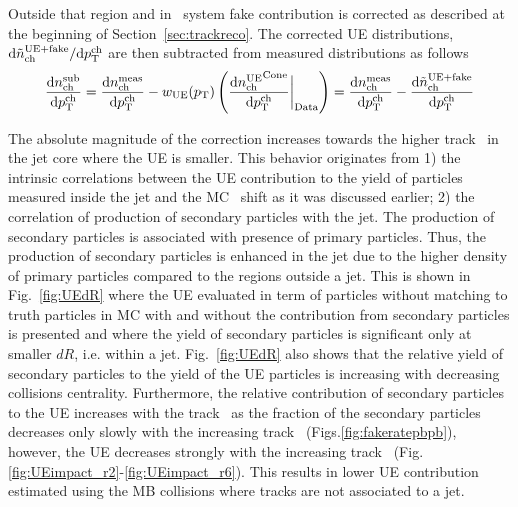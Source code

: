 Outside that region and in \pp\ system fake contribution is corrected as described at the beginning of Section~\ref{sec:trackreco}.
 The corrected UE distributions, $\mathrm{d} \mbox{$\tilde{n}_{\mathrm{ch}}^{\mathrm{UE+fake}}$} / \mathrm{d} \mbox{$p_{{\mathrm{T}}}^{\mathrm{ch}}$}$ are then subtracted from measured distributions as follows
 \begin{eqnarray}
\frac{\mathrm{d} n_{\mathrm{ch}}^{\mathrm{sub}}}{\mathrm{d} \mbox{$p_{{\mathrm{T}}}^{\mathrm{ch}}$}}  = \frac{\mathrm{d} n_{\mathrm{ch}}^{\mathrm{meas}}}{\mathrm{d} \mbox{$p_{{\mathrm{T}}}^{\mathrm{ch}}$}} - {w_{\mathrm{UE}} (\mbox{$p_{\mathrm{T}}$})} \left( \frac{\mathrm{d} \mbox{$n_{\mathrm{ch}}^{\mathrm{UE}}$}^{\mathrm{Cone}}}{\mathrm{d} \mbox{$p_{{\mathrm{T}}}^{\mathrm{ch}}$}} \bigg|_{\mathrm{Data}} \right)  = \frac{\mathrm{d} n_{\mathrm{ch}}^{\mathrm{meas}}}{\mathrm{d} \mbox{$p_{{\mathrm{T}}}^{\mathrm{ch}}$}} - \frac{\mathrm{d} \mbox{$\tilde{n}_{\mathrm{ch}}^{\mathrm{UE+fake}}$}}{\mathrm{d} \mbox{$p_{{\mathrm{T}}}^{\mathrm{ch}}$}}
 \end{eqnarray}


The absolute magnitude of the correction increases towards the higher track \pt\ in the jet core where the UE is smaller.
This behavior originates from 1) the intrinsic correlations between the UE contribution to the yield of particles measured inside the jet and the MC \pTjet\ shift as it was discussed earlier; 2) the correlation of production of secondary particles with the jet.
 The production of secondary particles is associated with presence of primary particles.
Thus, the production of secondary particles is enhanced in the jet due to the higher density of primary particles compared to the regions outside a jet.
This is shown in Fig.~\ref{fig:UEdR} where the UE evaluated in term of particles without matching to truth particles in MC with and without the contribution from secondary particles is presented and where the yield of secondary particles is significant only at smaller $dR$, i.e.
within a jet.
 Fig.~\ref{fig:UEdR} also shows that the relative yield of secondary particles to the yield of the UE particles is increasing with decreasing collisions centrality.
Furthermore, the relative contribution of secondary particles to the UE increases with the track \pT\ as the fraction of the secondary particles decreases only slowly with the increasing track \pT\ (Figs.\ref{fig:fakeratepbpb}), however, the UE decreases strongly with the increasing track \pT\ (Fig.\ref{fig:UEimpact_r2}-\ref{fig:UEimpact_r6}).
This results in lower UE contribution estimated using the MB collisions where tracks are not associated to a jet.

     

